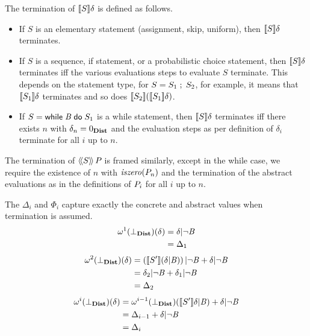 \begin{definition} The termination of $ [\![{S}]\!]{\delta} $ is defined
as follows.
\begin{itemize}
\item{} If $ S $ is an elementary statement (assignment, skip,
uniform), then $ [\![{S}]\!]{\delta} $ terminates.
\item{} If $ S $ is a sequence, if statement, or a probabilistic
choice statement, then $ [\![{S}]\!]{\delta} $ terminates iff the
various evaluations steps to evaluate $ S $ terminate. This depends on
the statement type, for $ S = {S_1} \;;\; {S_2} $, for example, it means
that $ [\![{S_1}]\!]{\delta} $ terminates and so does
$ [\![{S_2}]\!]{\left( [\![{S_1}]\!]{\delta} \right)} $.
\item{} If $ S = \mathsf{while}\;{\mathit{B}}\;\mathsf{do}\;{S_1} $ is a while statement, then $ [\![{S}]\!]{\delta} $
terminates iff there exists $ n $ with $ \delta_n = 0_{\textbf{Dist}} $ and the evaluation steps as per definition of $ \delta_i
$ terminate for all $ i $ up to $ n $.
\end{itemize}

The termination of $ \langle\!\langle{S}\rangle\!\rangle\,{P_{}} $ is framed similarly,
except in the while case, we require the existence of $ n $ with
$ \mathit{iszero}(P_{n}) $ and the termination of the abstract evaluations as
in the definitions of $ P_{i} $ for all $ i $ up to $ n $.
\end{definition}

The $ \Delta_i $ and $ \Phi_i $ capture exactly the concrete and
abstract values when termination is assumed.
\begin{align*}
\omega^1(\bot_{\textbf{Dist}})(\delta) & = \delta | \neg \mathit{B} \\
 & = \Delta_1
\end{align*}
\begin{align*}
\omega^2(\bot_{\textbf{Dist}})(\delta)
& = \left( [\![{S'}]\!]{\left( \delta | \mathit{B}\right)} \right) | \neg \mathit{B}
+ \delta | \neg \mathit{B} \\
& = \delta_2 | \neg \mathit{B} + \delta_1 | \neg \mathit{B} \\
& = \Delta_2
\end{align*}
\begin{align*}
\omega^i(\bot_{\textbf{Dist}})(\delta)
& = \omega^{i-1}(\bot_{\textbf{Dist}})([\![{S'}]\!]{\delta | \mathit{B}})
+ \delta | \neg \mathit{B} \\
& = \Delta_{i-1} + \delta | \neg \mathit{B} \\
& = \Delta_i
\end{align*}

